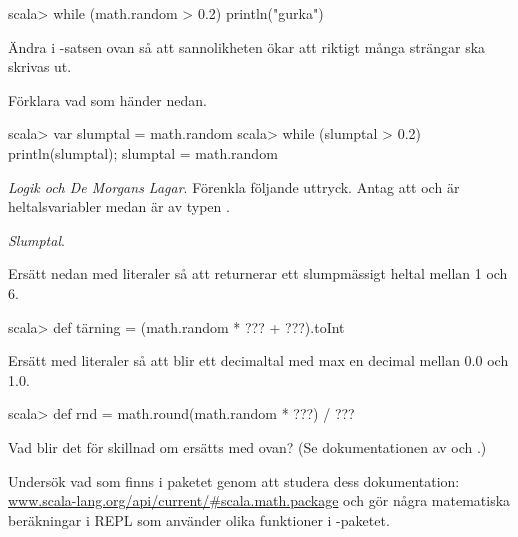 {{{{{{{\begin{REPLnonum}
scala> while (math.random > 0.2) println("gurka")
\end{REPLnonum}

\Subtask Ändra i -satsen ovan så att sannolikheten ökar att riktigt många strängar ska skrivas ut.

\Subtask Förklara vad som händer nedan.
\begin{REPL}
scala> var slumptal = math.random
scala> while (slumptal > 0.2) { println(slumptal); slumptal = math.random }
\end{REPL}

\Task\Pen \textit{Logik och De Morgans Lagar}. Förenkla följande uttryck. Antag att  och  är heltalsvariabler medan  är av typen .

\Subtask {}

\Subtask {}

\Subtask {}

\Subtask {}

\Subtask {}

\Subtask {}

\Subtask {}


\clearpage

\ExtraTasks

\Task \textit{Slumptal}.

\Subtask Ersätt  nedan med literaler så att  returnerar ett slumpmässigt heltal mellan 1 och 6.
\begin{REPLnonum}
scala> def tärning = (math.random * ??? + ???).toInt
\end{REPLnonum}

\Subtask Ersätt  med literaler så att  blir ett decimaltal med max en decimal mellan 0.0 och 1.0.
\begin{REPLnonum}
scala> def rnd = math.round(math.random * ???) / ???
\end{REPLnonum}

\Subtask Vad blir det för skillnad om  ersätts med  ovan? (Se dokumentationen av  och .)

\Task Undersök vad som finns i paketet  genom att studera dess dokumentation: \href{http://www.scala-lang.org/api/current/#scala.math.package}{www.scala-lang.org/api/current/\#scala.math.package} och gör några matematiska beräkningar i REPL som använder olika funktioner i -paketet.

}}}}}}}
